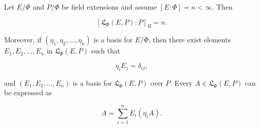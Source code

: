 Let $E/\Phi$ and $P/\Phi$ be field extensions and assume $[E:\Phi] = n < \infty$. Then

$$[\mathfrak{L}_\Phi(E, P) : P]_R = n.$$

Moreover, if $(\eta_1, \eta_2, \dots, \eta_n)$ is a basis for $E/\Phi$, then there exist elements $E_1, E_2, \dots, E_n$ in $\mathfrak{L}_\Phi(E, P)$ such that

$$\eta_i E_j = \delta_{ij},$$

and $(E_1, E_2, \dots, E_n)$ is a basis for $\mathfrak{L}_\Phi(E, P)$ over $P$. Every $A \in \mathfrak{L}_\Phi(E, P)$ can be expressed as

$$A = \sum_{i=1}^{n} E_i (\eta_i A).$$
